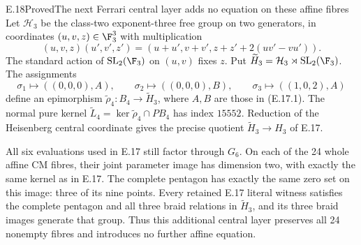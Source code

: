 \begin{statement}{E.18}{Proved}{The next Ferrari central layer adds no equation on these affine fibres}
Let $\mathcal H_3$ be the class-two exponent-three free group on two
generators, in coordinates $(u,v,z)\in\F_3^3$ with multiplication
\[
 (u,v,z)(u',v',z')=
 (u+u',v+v',z+z'+2(uv'-vu')).
\]
The standard action of $\mathrm{SL}_2(\F_3)$ on $(u,v)$ fixes $z$.
Put $\widetilde H_3=\mathcal H_3\rtimes\mathrm{SL}_2(\F_3)$.
The assignments
\[
 \sigma_1\longmapsto((0,0,0),A),\qquad
 \sigma_2\longmapsto((0,0,0),B),\qquad
 \sigma_3\longmapsto((1,0,2),A)
 \tag{E.18.1}
\]
define an epimorphism $\widetilde\rho_4:B_4\to\widetilde H_3$,
where $A,B$ are those in (E.17.1). The normal pure kernel
$\widetilde L_4=\ker\widetilde\rho_4\cap PB_4$ has index $15552$.
Reduction of the Heisenberg central coordinate gives the precise
quotient $\widetilde H_3\to H_3$ of E.17.

All six evaluations used in E.17 still factor through $G_6$.
On each of the 24 whole affine CM fibres, their joint parameter
image has dimension two, with exactly the same kernel as in E.17.
The complete pentagon has exactly the same zero set on this
image: three of its nine points. Every retained E.17 literal
witness satisfies the complete pentagon and all three braid
relations in $\widetilde H_3$, and its three braid images generate
that group. Thus this additional central layer preserves all
24 nonempty fibres and introduces no further affine equation.
\end{statement}
